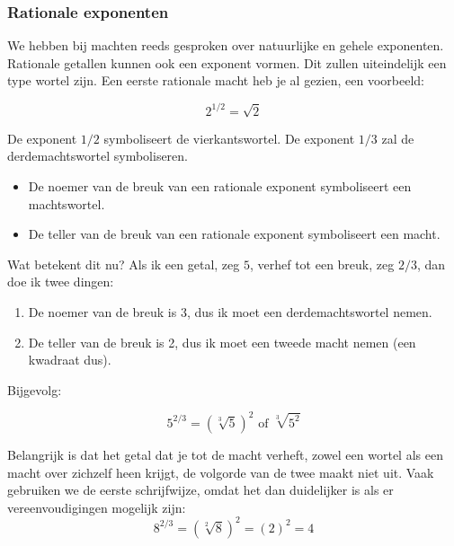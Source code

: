 \subsubsection{Rationale exponenten}

We hebben bij machten reeds gesproken over natuurlijke en gehele exponenten. Rationale getallen kunnen ook een exponent vormen. Dit zullen uiteindelijk een type wortel zijn. Een eerste rationale macht heb je al gezien, een voorbeeld:

\begin{equation*}
2^{1/2}=\sqrt{2}
\end{equation*}

De exponent $1/2$ symboliseert de vierkantswortel. De exponent $1/3$ zal de derdemachtswortel symboliseren.


\begin{definitie}
	
\begin{itemize}
\item De noemer van de breuk van een rationale exponent symboliseert een machtswortel.
\item De teller van de breuk van een rationale exponent symboliseert een macht.
\end{itemize}
\end{definitie}

Wat betekent dit nu? Als ik een getal, zeg $5$, verhef tot een breuk, zeg $2/3$, dan doe ik twee dingen:

\begin{enumerate}
	\item De noemer van de breuk is 3, dus ik moet een derdemachtswortel nemen.
	\item De teller van de breuk is 2, dus ik moet een tweede macht nemen (een kwadraat dus).
\end{enumerate}

Bijgevolg:

\begin{equation*}
5^{2/3} = (\sqrt[3]{5})^2 \text{ of } \sqrt[3]{5^2}
\end{equation*}

Belangrijk is dat het getal dat je tot de macht verheft, zowel een wortel als een macht over zichzelf heen krijgt, de volgorde van de twee maakt niet uit. Vaak gebruiken we de eerste schrijfwijze, omdat het dan duidelijker is als er vereenvoudigingen mogelijk zijn:
\begin{equation*}
8^{2/3} = (\sqrt[2]{8})^2 = (2)^2 = 4
\end{equation*}

